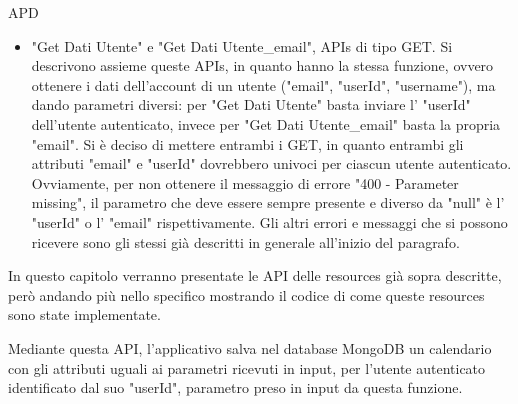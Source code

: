 \begin{listaPersonale} {APD}
\begin{listaPersonale2}[APD]{}
\begin{listaPersonale3}[APD]{}
\begin{itemize}
                \item "Get Dati Utente" e "Get Dati Utente\_email", APIs di tipo GET. Si descrivono assieme queste APIs, in quanto hanno la stessa funzione, ovvero ottenere i dati dell'account di un utente ("email", "userId", "username"), ma dando parametri diversi: per "Get Dati Utente" basta inviare l' "userId" dell'utente autenticato, invece per "Get Dati Utente\_email" basta la propria "email". Si è deciso di mettere entrambi i GET, in quanto entrambi gli attributi "email" e "userId" dovrebbero univoci per ciascun utente autenticato. Ovviamente, per non ottenere il messaggio di errore "400 - Parameter missing", il parametro che deve essere sempre presente e diverso da "null" è l' "userId" o l' "email" rispettivamente. Gli altri errori e messaggi che si possono ricevere sono gli stessi già descritti in generale all'inizio del paragrafo.
            \end{itemize}
            \begin{center}
                
            \end{center}
        \end{listaPersonale3}
    \end{listaPersonale2}
    In questo capitolo verranno presentate le API delle resources già sopra descritte, però andando più nello specifico mostrando il codice di come queste resources sono state implementate.
    \begin{listaPersonale2}[APD]{}
                Mediante questa API, l'applicativo salva nel database MongoDB un calendario con gli attributi uguali ai parametri ricevuti in input, per l'utente autenticato identificato dal suo "userId", parametro preso in input da questa funzione.

\end{listaPersonale2}
\end{listaPersonale}
